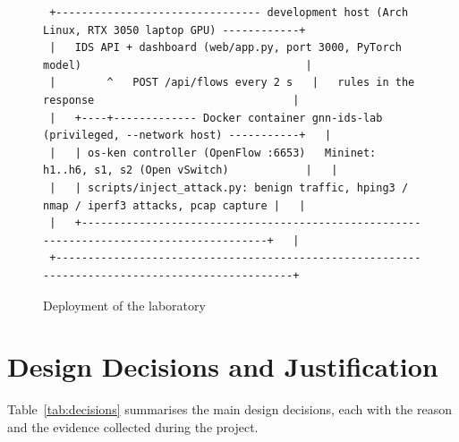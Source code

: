 \begin{figure}[htbp]
\centering
\scriptsize
\begin{verbatim}
 +-------------------------------- development host (Arch Linux, RTX 3050 laptop GPU) ------------+
 |   IDS API + dashboard (web/app.py, port 3000, PyTorch model)                                   |
 |        ^   POST /api/flows every 2 s   |   rules in the response                               |
 |   +----+------------- Docker container gnn-ids-lab (privileged, --network host) -----------+   |
 |   | os-ken controller (OpenFlow :6653)   Mininet: h1..h6, s1, s2 (Open vSwitch)            |   |
 |   | scripts/inject_attack.py: benign traffic, hping3 / nmap / iperf3 attacks, pcap capture |   |
 |   +----------------------------------------------------------------------------------------+   |
 +------------------------------------------------------------------------------------------------+
\end{verbatim}
\caption{Deployment of the laboratory}
\label{fig:deploy}
\end{figure}


\section{Design Decisions and Justification}
Table~\ref{tab:decisions} summarises the main design decisions, each with the reason and the evidence collected during the project.

